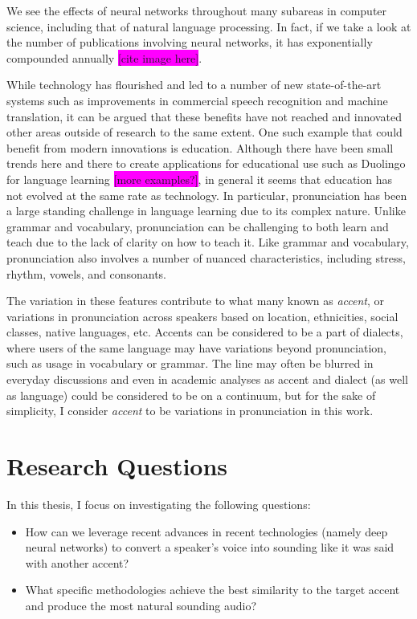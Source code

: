 \documentclass
[
    a4paper,
    twoside,
    12pt,
]
{report}
\begin{document}
We see the effects of neural networks throughout many subareas in
computer science, including that of natural language processing. In
fact, if we take a look at the number of publications involving neural
networks, it has exponentially compounded annually
\colorbox{magenta}{[cite image here]}.

While technology has flourished and led to a number of new
state-of-the-art systems such as improvements in commercial speech
recognition and machine translation, it can be argued that these
benefits have not reached and innovated other areas outside of research
to the same extent. One such example that could benefit from modern
innovations is education. Although there have been small trends here and
there to create applications for educational use such as Duolingo for
language learning \colorbox{magenta}{[more examples?]}, in general it
seems that education has not evolved at the same rate as technology. In
particular, pronunciation has been a large standing challenge in
language learning due to its complex nature. Unlike grammar and
vocabulary, pronunciation can be challenging to both learn and teach due
to the lack of clarity on how to teach it. Like grammar and vocabulary,
pronunciation also involves a number of nuanced characteristics,
including stress, rhythm, vowels, and consonants.

The variation in these features contribute to what many known as
\emph{accent}, or variations in pronunciation across speakers based on
location, ethnicities, social classes, native languages, etc. Accents
can be considered to be a part of dialects, where users of the same
language may have variations beyond pronunciation, such as usage in
vocabulary or grammar. The line may often be blurred in everyday
discussions and even in academic analyses as accent and dialect (as well
as language) could be considered to be on a continuum, but for the sake
of simplicity, I consider \emph{accent} to be variations in
pronunciation in this work.

\hypertarget{research-questions}{%
\section{Research Questions}\label{research-questions}}

In this thesis, I focus on investigating the following questions:

\begin{itemize}
\item
  How can we leverage recent advances in recent technologies (namely
  deep neural networks) to convert a speaker's voice into sounding like
  it was said with another accent?
\item
  What specific methodologies achieve the best similarity to the target
  accent and produce the most natural sounding audio?
\end{itemize}
\end{document}
